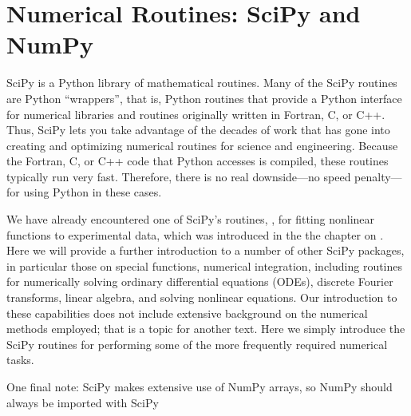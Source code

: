 \documentclass[letterpaper,10pt,english]{sphinxmanual}
\begin{document}
\sphinxstepscope


\chapter{Numerical Routines: SciPy and NumPy}
\label{\detokenize{chap9/chap9_scipy:numerical-routines-scipy-and-numpy}}\label{\detokenize{chap9/chap9_scipy:chap9}}\label{\detokenize{chap9/chap9_scipy::doc}}
\sphinxAtStartPar
SciPy is a Python library of mathematical routines.  Many of the SciPy routines are Python “wrappers”, that is, Python routines that provide a Python interface for numerical libraries and routines originally written in Fortran, C, or C++.  Thus, SciPy lets you take advantage of the decades of work that has gone into creating and optimizing numerical routines for science and engineering.  Because the Fortran, C, or C++ code that Python accesses is compiled, these routines typically run very fast.  Therefore, there is no real downside—no speed penalty—for using Python in these cases.

\sphinxAtStartPar
We have already encountered one of SciPy’s routines, , for fitting nonlinear functions to experimental data, which was introduced in the the chapter on {\hyperref[\detokenize{chap8/chap8_fitting:chap8}]{}}.   Here we will provide a further introduction to a number of other SciPy packages, in particular those on special functions, numerical integration, including routines for numerically solving ordinary differential equations (ODEs), discrete Fourier transforms, linear algebra, and solving non\sphinxhyphen{}linear equations.  Our introduction to these capabilities does not include extensive background on the numerical methods employed; that is a topic for another text.  Here we simply introduce the SciPy routines for performing some of the more frequently required numerical tasks.

\sphinxAtStartPar
One final note:  SciPy makes extensive use of NumPy arrays, so NumPy should always be imported with SciPy

\ignorespaces 
\end{document}
